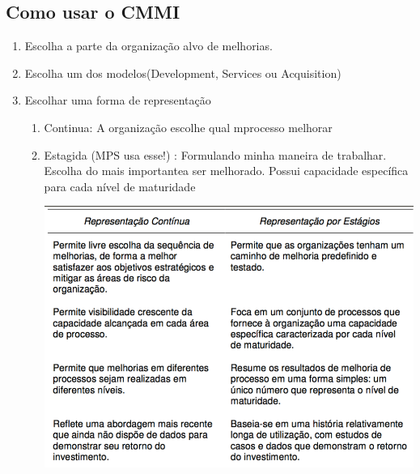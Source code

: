 \documentclass{article}
\begin{document}
\subsection{Como usar o CMMI}

\begin{enumerate}
\item Escolha a parte da organização alvo de melhorias.
\item Escolha um dos modelos(Development, Services ou Acquisition)
\item Escolhar uma forma de representação
	\begin{enumerate}
	\item Continua: A organização escolhe qual mprocesso melhorar
	\item Estagida (MPS usa esse!) : Formulando minha maneira de trabalhar. Escolha do mais importantea ser melhorado. Possui capacidade específica para cada nível de maturidade\\
	\begin{center}
		\includegraphics[scale=0.40]{representacoes_cont_estag}
	\end{center}	
	\end{enumerate}	 
\end{enumerate}	
\end{document}
